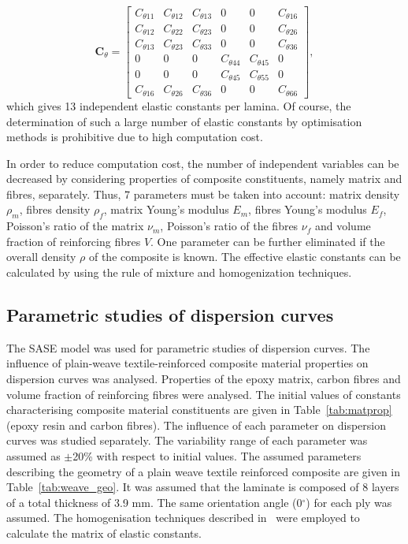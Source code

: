 \documentclass[preprint,12pt]{elsarticle}
\newcommand{\matr}[1]{\mathbf{#1}} %
\begin{document}
 \begin{equation}
 \matr{C}_{\theta} = \left[\begin{array}{cccccc} C_{\theta 11} & C_{\theta 12}& C_{\theta 13} & 0&0&C_{\theta 16}\\[2pt]
 C_{\theta 12}& C_{\theta 22} & C_{\theta 23}& 0 &0&C_{\theta 26}\\[2pt]
 C_{\theta 13}&C_{\theta 23}&C_{\theta 33}&0&0&C_{\theta 36}\\[2pt]
 0& 0&0&C_{\theta 44}& C_{\theta 45}&0\\[2pt]
 0&0&0&C_{\theta 45}&C_{\theta 55}&0\\[2pt]
 C_{\theta 16}&C_{\theta 26} &C_{\theta 36}&0&0&C_{\theta 66}
 \end{array}\right], 
 \label{eq:elastic_constatns_theta}
 \end{equation} 
 which gives 13 independent elastic constants per lamina. Of course, the determination of such a large number of elastic constants by optimisation methods is prohibitive due to high computation cost. 
 
 In order to reduce computation cost, the number of independent variables can be decreased by considering properties of composite constituents, namely matrix and fibres, separately. Thus,  7 parameters must be taken into account: matrix density $\rho_m$, fibres density $\rho_f$, matrix Young's modulus $E_m$, fibres Young's modulus $E_f$, Poisson's ratio of the matrix $\nu_m$, Poisson's ratio of the fibres $\nu_f$ and volume fraction of reinforcing fibres $V$. One parameter can be further eliminated if the overall density $\rho$ of the composite is known. The effective elastic constants can be calculated by using the rule of mixture and homogenization techniques.
 \subsection{Parametric studies of dispersion curves \label{sec:parametric}}
 The SASE model was used for parametric studies of dispersion curves. The influence of plain-weave textile-reinforced composite material properties on dispersion curves was analysed. Properties of the epoxy matrix, carbon fibres and volume fraction of reinforcing fibres were analysed. The initial values of constants characterising composite material constituents are given in Table~\ref{tab:matprop} (epoxy resin and carbon fibres). The influence of each parameter on dispersion curves was studied separately. The variability range of each parameter was assumed as $\pm$20\% with respect to initial values. The assumed parameters describing the geometry of a plain weave textile reinforced composite are given in Table~\ref{tab:weave_geo}. It was assumed that the laminate is composed of 8 layers of a total thickness of 3.9 mm. The same orientation angle (0$^{\circ}$) for each ply was assumed. The homogenisation techniques described in~\cite{Barbero2006,Adumitroaie2012} were employed to calculate the matrix of elastic constants.
 
\end{document}
